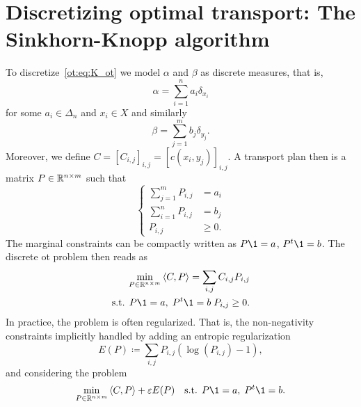 \section{Discretizing optimal transport: The Sinkhorn-Knopp algorithm}
To discretize~\eqref{ot:eq:K_ot} we model $\alpha$ and $\beta$ as discrete measures, that is,
\begin{equation}
    \alpha = \sum_{i=1}^n a_i \delta_{x_i}
\end{equation}
for some $a_i\in \Delta_n$ and $x_i\in X$ and similarly 
\begin{equation}
    \beta = \sum_{j=1}^m b_j \delta_{y_j}.
\end{equation}
Moreover, we define $C = [C_{i,j}]_{i,j} = [c(x_i,y_j)]_{i,j}$. A transport plan then is a matrix $P\in \mathbb{R}^{n\times m}$ such that 
\begin{equation}
    \begin{cases}
        \sum_{j=1}^m P_{i,j} &= a_i\\
        \sum_{i=1}^n P_{i,j} &= b_j\\
        P_{i,j}&\geq 0.
    \end{cases}
\end{equation}
The marginal constraints can be compactly written as $P\1=a$, $P^t\1 = b$. The discrete \gls{ot} problem then reads as
\begin{equation}
    \begin{aligned}
        \min_{P\in \R^{n\times m}}\inner{C}{P} = \sum_{i,j}C_{i,j}P_{i,j}\\
        \text{s.t. } P\1=a,\;P^t\1 = b\; P_{i,j}\geq 0.
    \end{aligned}
\end{equation}
In practice, the problem is often regularized. That is, the non-negativity constraints implicitly handled by adding an entropic regularization
\begin{equation}
    E(P) \coloneq \sum_{i,j} P_{i,j}(\log(P_{i,j})-1),
\end{equation}
and considering the problem
\begin{equation}\label{ot:eq:disc_entropic}
    \begin{aligned}
        \min_{P\in \R^{n\times m}}\inner{C}{P} + \epsilon E(P)
        \quad \text{s.t. } P\1=a,\;P^t\1 = b.
    \end{aligned}
\end{equation}


